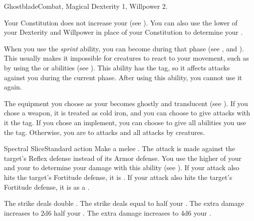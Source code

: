   \begin{magicalfeat}{Ghostblade}{Combat, Magical}
    \featpre Dexterity 1, Willpower 2.

     Your Constitution does not increase your  (see ).
    You can also use the lower of your Dexterity and Willpower in place of your Constitution to determine your .

     When you use the \textit{sprint} ability, you can become  during that phase (see , and ).
    This usually makes it impossible for creatures to react to your movement, such as by using the  or  abilities (see ).
    This ability has the  tag, so it affects attacks against you during the current phase.
    After using this ability, you  cannot use it again.

     The equipment you choose as your  becomes ghostly and translucent (see ).
    If you chose a weapon, it is treated as cold iron, and you can choose to give attacks with it the \atCold tag.
    If you chose an implement, you can choose to give all \magical abilities you use the \atCold tag.
    Otherwise, you are \impervious to \atCold attacks and all attacks by  creatures.

    \begin{magicalactiveability}{Spectral Slice}{Standard action}
      \rankline
      Make a melee .
      The attack is made against the target's Reflex defense instead of its Armor defense.
      You use the higher of your  and your  to determine your damage with this ability (see ).
      \hit If your attack also hits the target's Fortitude defense, it is  \slowed.
      \injury If your attack also hits the target's Fortitude defense, it is \slowed as a .

      \rankline
       The strike deals double .
       The strike deals  equal to half your .
       The extra damage increases to 2d6 \add half your .
       The extra damage increases to 4d6 \add your .
    \end{magicalactiveability}


\end{magicalfeat}
